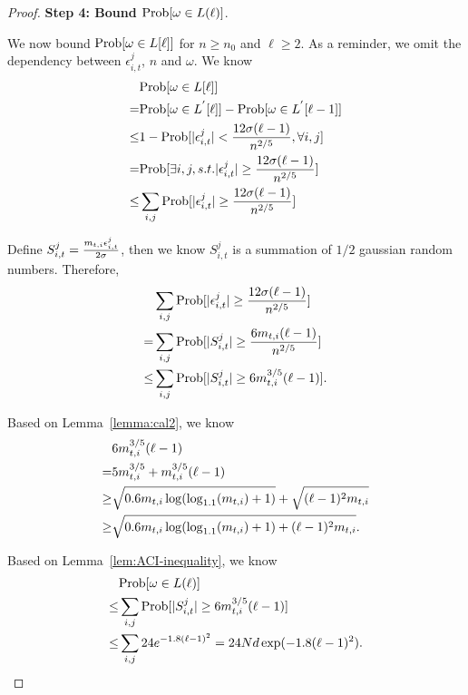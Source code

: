 \begin{proof}
\noindent\textbf{Step 4: Bound $\Prob{\omega\in L(\ell)}$}.

We now bound $\Prob{\omega\in L[\ell]}$ for $n\geq n_0$ and $\ell\geq 2$. As a reminder, we omit the dependency between $\epsilon_{i,t}^{j}$, $n$ and $\omega$. We know 
\begin{align}
&\Prob{\omega\in L[\ell]} \nonumber \\
=&\Prob{\omega\in L^{'}[\ell]}- \Prob{\omega\in L^{'}[\ell-1]} \nonumber \\
\leq & 1-\Prob{|\epsilon_{i,t}^{j}|<\frac{12\sigma (\ell-1)}{n^{2/5}}, \forall i,j} \nonumber \\
=&\Prob{\exists i,j, s.t. |\epsilon_{i,t}^{j}|\geq \frac{12\sigma (\ell-1)}{n^{2/5}}} \nonumber  \\
\leq &\sum_{i,j}\Prob{|\epsilon_{i,t}^{j}|\geq \frac{12\sigma (\ell-1)}{n^{2/5}}} \nonumber
\end{align}

Define $S_{i,t}^{j}=\frac{m_{t,i}\epsilon_{i,t}^{j}}{2\sigma}$, then we know $S_{i,t}^{j}$ is a summation of $1/2$ gaussian random numbers. Therefore,
\begin{align}
&\sum_{i,j}\Prob{|\epsilon_{i,t}^{j}|\geq \frac{12\sigma(\ell-1)}{n^{2/5}}} \nonumber \\ 
=&\sum_{i,j}\Prob{|S_{i,t}^{j}|\geq \frac{6\NumPull{t}{i}(\ell-1)}{n^{2/5}}} \nonumber \\
\leq &\sum_{i,j}\Prob{|S_{i,t}^{j}|\geq 6\NumPull{t}{i}^{3/5}(\ell-1)}. \nonumber
\end{align}

Based on Lemma~\ref{lemma:cal2}, we know
\begin{align}
&6m_{t,i}^{3/5}(\ell-1) \nonumber \\
=& 5m_{t,i}^{3/5} + m_{t,i}^{3/5}(\ell-1) \nonumber \\
\geq & \sqrt{0.6m_{t,i}\log(\log_{1.1}(m_{t,i})+1)} + \sqrt{(\ell-1)^2 m_{t,i}} \nonumber \\
\geq & \sqrt{0.6m_{t,i}\log(\log_{1.1}(m_{t,i})+1)+(\ell-1)^2 m_{t,i}}. \nonumber
\end{align}

Based on Lemma~\ref{lem:ACI-inequality}, we know
\begin{align}
& \Prob{\omega\in L(\ell)} \nonumber \\
\leq &\sum_{i,j}\Prob{|S_{i,t}^{j}|\geq 6\NumPull{t}{i}^{3/5}(\ell-1)} \nonumber \\
\leq & \sum_{i,j}24e^{-1.8(\ell-1)^2} = 24\ARMNUM d\exp(-1.8(\ell-1)^2). \nonumber
\end{align}


\end{proof}
